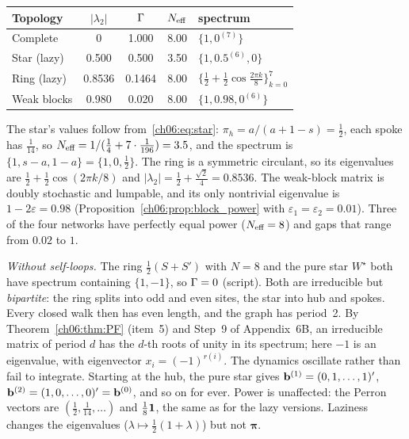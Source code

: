 \documentclass[../solutions_manual.tex]{subfiles}
\begin{document}
\begin{center}
\begin{tabular}{lcccl}
\toprule
Topology & $|\lambda_2|$ & $\Gamma$ & $N_{\text{eff}}$ & spectrum \\
\midrule
Complete & 0 & 1.000 & 8.00 & $\{1, 0^{(7)}\}$ \\
Star (lazy) & 0.500 & 0.500 & 3.50 & $\{1, 0.5^{(6)}, 0\}$ \\
Ring (lazy) & 0.8536 & 0.1464 & 8.00 & $\{\frac12 + \frac12\cos\frac{2\pi k}{8}\}_{k=0}^{7}$ \\
Weak blocks & 0.980 & 0.020 & 8.00 & $\{1, 0.98, 0^{(6)}\}$ \\
\bottomrule
\end{tabular}
\end{center}
The star's values follow from~\eqref{ch06:eq:star}: $\pi_h = a/(a+1-s) = \frac12$, each spoke has $\frac{1}{14}$, so $N_{\text{eff}} = 1/(\frac14 + 7\cdot\frac{1}{196}) = 3.5$, and the spectrum is $\{1, s - a, 1-a\} = \{1, 0, \frac12\}$. The ring is a symmetric circulant, so its eigenvalues are $\frac12 + \frac12\cos(2\pi k/8)$ and $|\lambda_2| = \frac12 + \frac{\sqrt2}{4} = 0.8536$. The weak-block matrix is doubly stochastic and lumpable, and its only nontrivial eigenvalue is $1 - 2\varepsilon = 0.98$ (Proposition~\ref{ch06:prop:block_power} with $\varepsilon_1 = \varepsilon_2 = 0.01$). Three of the four networks have perfectly equal power ($N_{\text{eff}} = 8$) and gaps that range from $0.02$ to $1$.

\emph{Without self-loops.} The ring $\frac12(S + S')$ with $N = 8$ and the pure star $W^\star$ both have spectrum containing $\{1, -1\}$, so $\Gamma = 0$ (script). Both are irreducible but \emph{bipartite}: the ring splits into odd and even sites, the star into hub and spokes. Every closed walk then has even length, and the graph has period~2. By Theorem~\ref{ch06:thm:PF} (item~5) and Step~9 of Appendix~6B, an irreducible matrix of period $d$ has the $d$-th roots of unity in its spectrum; here $-1$ is an eigenvalue, with eigenvector $x_i = (-1)^{r(i)}$. The dynamics oscillate rather than fail to integrate. Starting at the hub, the pure star gives $\mathbf{b}^{(1)} = (0,1,\ldots,1)'$, $\mathbf{b}^{(2)} = (1, 0, \ldots, 0)' = \mathbf{b}^{(0)}$, and so on for ever. Power is unaffected: the Perron vectors are $(\frac12, \frac{1}{14}, \ldots)$ and $\frac18\mathbf{1}$, the same as for the lazy versions. Laziness changes the eigenvalues ($\lambda \mapsto \frac12(1+\lambda)$) but not $\boldsymbol{\pi}$.
\end{document}

